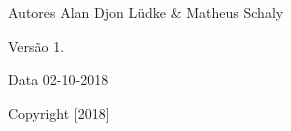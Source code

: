 \begin{DoxyAuthor}{Autores}
Alan Djon Lüdke \& Matheus Schaly 
\end{DoxyAuthor}
\begin{DoxyVersion}{Versão}
1. 
\end{DoxyVersion}
\begin{DoxyDate}{Data}
02-\/10-\/2018
\end{DoxyDate}
\begin{DoxyCopyright}{Copyright}
[2018] 
\end{DoxyCopyright}
